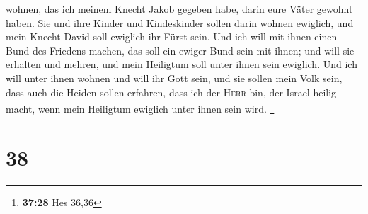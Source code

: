wohnen, das ich meinem Knecht Jakob gegeben habe, darin eure Väter
gewohnt haben. Sie und ihre Kinder und Kindeskinder sollen darin wohnen
ewiglich, und mein Knecht David soll ewiglich ihr Fürst sein.
 Und ich will mit ihnen einen Bund des Friedens machen,
das soll ein ewiger Bund sein mit ihnen; und will sie erhalten und
mehren, und mein Heiligtum soll unter ihnen sein ewiglich.
 Und ich will unter ihnen wohnen und will ihr Gott sein,
und sie sollen mein Volk sein,  dass auch die Heiden
sollen erfahren, dass ich der \textsc{Herr} bin, der Israel heilig
macht, wenn mein Heiligtum ewiglich unter ihnen sein wird. \footnote{\textbf{37:28}
  Hes 36,36}

\hypertarget{section-11}{%
\section{38}\label{section-11}}


